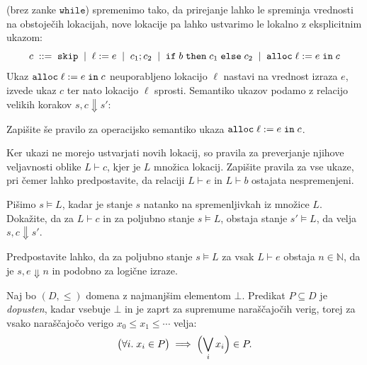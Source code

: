 \documentclass[arhiv]{../izpit}
\begin{document}
\imp{} (brez zanke $\mathtt{while}$) spremenimo tako, da prirejanje
lahko le spreminja vrednosti na obstoječih lokacijah, nove lokacije pa
lahko ustvarimo le lokalno z eksplicitnim ukazom:
%
\[
  c \;\mathrel{{:}{:}{=}}\; \mathtt{skip} \;\mid\; \ell := e \;\mid\; c_1 ; c_2 \;\mid\; \mathtt{if}\;b\;\mathtt{then}\;c_1\;\mathtt{else}\;c_2 \;\mid\; \mathtt{alloc}\;\ell := e\;\mathtt{in}\;c
\]
%
Ukaz $\mathtt{alloc}\;\ell := e\;\mathtt{in}\;c$ neuporabljeno lokacijo $\ell$ nastavi na
vrednost izraza $e$, izvede ukaz $c$ ter nato lokacijo $\ell$ sprosti.
Semantiko ukazov podamo z relacijo velikih korakov $s, c \Downarrow
s'$:
%

\podnaloga[\tocke{5}]
Zapišite še pravilo za operacijsko semantiko ukaza $\mathtt{alloc}\;\ell := e\;\mathtt{in}\;c$.

\podnaloga[\tocke{5}]
Ker ukazi ne morejo ustvarjati novih lokacij, so pravila za
preverjanje njihove veljavnosti oblike $L \vdash c$, kjer je $L$
množica lokacij. Zapišite pravila za vse ukaze, pri čemer lahko
predpostavite, da relaciji $L \vdash e$ in $L \vdash b$ ostajata
nespremenjeni.

\podnaloga[\tocke{10}]
Pišimo $s \models L$, kadar je stanje $s$ natanko na spremenljivkah iz
množice $L$. Dokažite, da za $L \vdash c$ in za poljubno stanje $s
\models L$, obstaja stanje $s' \models L$, da velja $s, c \Downarrow
s'$.

Predpostavite lahko, da za poljubno stanje $s \models L$ za vsak
$L \vdash e$ obstaja $n \in \mathbb{N}$, da je $s, e \Downarrow n$ in
podobno za logične izraze.

\nadaljevanje


\naloga[\tocke{20}]

\newcommand{\botplus}{\mathrel{+_{\!\!\scriptscriptstyle \bot}}}

Naj bo $(D, \le)$ domena z najmanjšim elementom $\bot$. Predikat $P
\subseteq D$ je \emph{dopusten}, kadar vsebuje $\bot$ in je zaprt za
supremume naraščajočih verig, torej za vsako naraščajočo verigo $x_0
\le x_1 \le \cdots$ velja:
\[
  \bigl(\forall i.\; x_i \in P\bigr) \implies \Bigl(\bigvee_i x_i\Bigr) \in P.
\]
\end{document}
